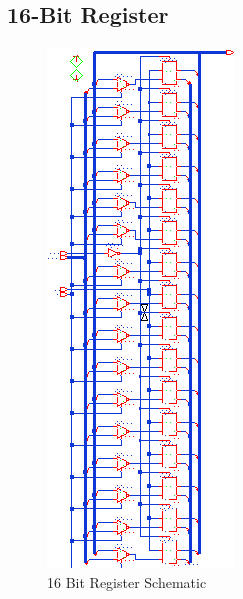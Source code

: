 \documentclass[11pt]{article}
\begin{document}
	\subsection{16-Bit Register}

		\begin{figure}[H] 
			\centering 
			\includegraphics[width=\textwidth,height=\dimexpr\textheight-4\baselineskip-\abovecaptionskip-\belowcaptionskip\relax,keepaspectratio]{"Pictures/nBitRegister 16-Bit Schematic"}
			\caption{16 Bit Register Schematic} 
			\label{fig:nBitRegister-16-Bit-Schematic} 
		\end{figure}
\end{document}
